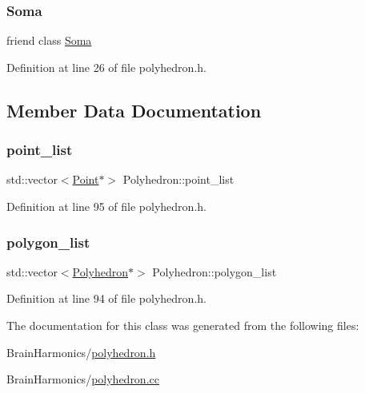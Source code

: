 \subsubsection{\texorpdfstring{Soma}{Soma}}
{\footnotesize\ttfamily friend class \hyperlink{class_soma}{Soma}\hspace{0.3cm}{\ttfamily [friend]}}



Definition at line 26 of file polyhedron.\+h.



\subsection{Member Data Documentation}
\mbox{\label{class_polyhedron_a4a39c8beb34831634b871dbc301502a6}} 
\subsubsection{\texorpdfstring{point\+\_\+list}{point\_list}}
{\footnotesize\ttfamily std\+::vector$<$\hyperlink{class_point}{Point}$\ast$$>$ Polyhedron\+::point\+\_\+list\hspace{0.3cm}{\ttfamily [protected]}}



Definition at line 95 of file polyhedron.\+h.

\mbox{\label{class_polyhedron_afd0cf6dddfbdc36266a73edca0c2c219}} 
\subsubsection{\texorpdfstring{polygon\+\_\+list}{polygon\_list}}
{\footnotesize\ttfamily std\+::vector$<$\hyperlink{class_polyhedron}{Polyhedron}$\ast$$>$ Polyhedron\+::polygon\+\_\+list\hspace{0.3cm}{\ttfamily [protected]}}



Definition at line 94 of file polyhedron.\+h.



The documentation for this class was generated from the following files\+:\begin{DoxyCompactItemize}
\item 
Brain\+Harmonics/\hyperlink{polyhedron_8h}{polyhedron.\+h}\item 
Brain\+Harmonics/\hyperlink{polyhedron_8cc}{polyhedron.\+cc}\end{DoxyCompactItemize}
